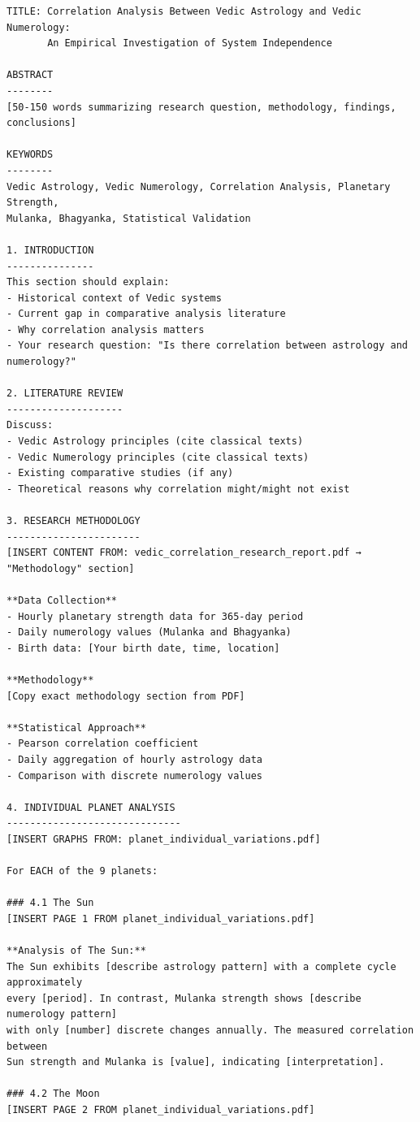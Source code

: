\documentclass[
  11pt,
  oneside,
  openany]{scrbook}
\begin{document}
\begin{verbatim}
TITLE: Correlation Analysis Between Vedic Astrology and Vedic Numerology:
       An Empirical Investigation of System Independence

ABSTRACT
--------
[50-150 words summarizing research question, methodology, findings, conclusions]

KEYWORDS
--------
Vedic Astrology, Vedic Numerology, Correlation Analysis, Planetary Strength,
Mulanka, Bhagyanka, Statistical Validation

1. INTRODUCTION
---------------
This section should explain:
- Historical context of Vedic systems
- Current gap in comparative analysis literature
- Why correlation analysis matters
- Your research question: "Is there correlation between astrology and numerology?"

2. LITERATURE REVIEW
--------------------
Discuss:
- Vedic Astrology principles (cite classical texts)
- Vedic Numerology principles (cite classical texts)
- Existing comparative studies (if any)
- Theoretical reasons why correlation might/might not exist

3. RESEARCH METHODOLOGY
-----------------------
[INSERT CONTENT FROM: vedic_correlation_research_report.pdf → "Methodology" section]

**Data Collection**
- Hourly planetary strength data for 365-day period
- Daily numerology values (Mulanka and Bhagyanka)
- Birth data: [Your birth date, time, location]

**Methodology**
[Copy exact methodology section from PDF]

**Statistical Approach**
- Pearson correlation coefficient
- Daily aggregation of hourly astrology data
- Comparison with discrete numerology values

4. INDIVIDUAL PLANET ANALYSIS
------------------------------
[INSERT GRAPHS FROM: planet_individual_variations.pdf]

For EACH of the 9 planets:

### 4.1 The Sun
[INSERT PAGE 1 FROM planet_individual_variations.pdf]

**Analysis of The Sun:**
The Sun exhibits [describe astrology pattern] with a complete cycle approximately
every [period]. In contrast, Mulanka strength shows [describe numerology pattern]
with only [number] discrete changes annually. The measured correlation between
Sun strength and Mulanka is [value], indicating [interpretation].

### 4.2 The Moon
[INSERT PAGE 2 FROM planet_individual_variations.pdf]


\end{verbatim}
\end{document}
